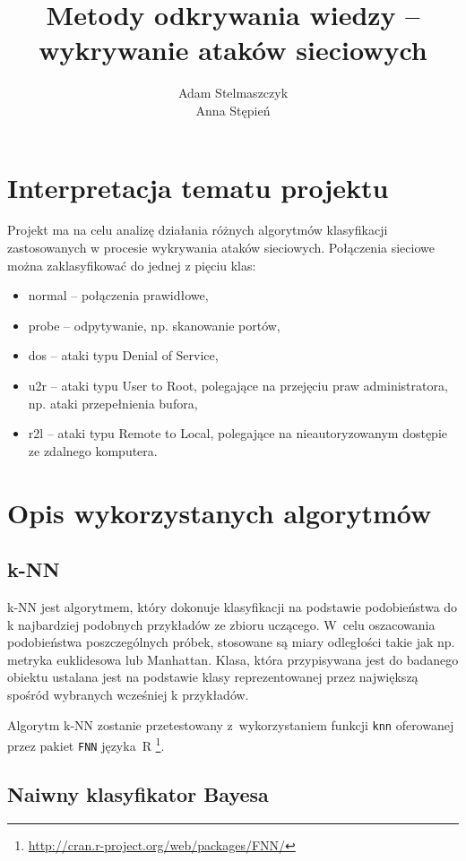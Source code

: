 \documentclass[a4paper, 12pt]{article}
\title{Metody odkrywania wiedzy -- wykrywanie ataków sieciowych}
\author{Adam Stelmaszczyk\\ Anna Stępień}
\begin{document}
\maketitle

\tableofcontents

\newpage

\section{Interpretacja tematu projektu}
Projekt ma na celu analizę działania różnych algorytmów klasyfikacji zastosowanych
w procesie wykrywania ataków sieciowych. Połączenia sieciowe można zaklasyfikować do jednej
z pięciu klas:
\begin{itemize}
  \item normal -- połączenia prawidłowe,
  \item probe -- odpytywanie, np. skanowanie portów,
  \item dos -- ataki typu Denial of Service,
  \item u2r -- ataki typu User to Root, polegające na przejęciu praw administratora, 
np. ataki przepełnienia bufora,
  \item r2l -- ataki typu Remote to Local, polegające na nieautoryzowanym dostępie ze zdalnego komputera.
\end{itemize} 

\section{Opis wykorzystanych algorytmów}\label{algorithms}

\subsection{k-NN}
k-NN jest algorytmem, który dokonuje klasyfikacji na podstawie podobieństwa do k 
najbardziej podobnych przykładów ze zbioru uczącego. W~celu oszacowania podobieństwa 
poszczególnych próbek, stosowane są miary odległości takie jak np. metryka euklidesowa lub Manhattan. 
Klasa, która przypisywana jest do badanego obiektu ustalana jest na podstawie klasy 
reprezentowanej przez największą spośród wybranych wcześniej k przykładów.

Algorytm k-NN zostanie przetestowany z~wykorzystaniem funkcji 
\texttt{knn} oferowanej przez pakiet \texttt{FNN} języka~R 
\footnote{\url{http://cran.r-project.org/web/packages/FNN/}}.

\subsection{Naiwny klasyfikator Bayesa}
\end{document}
